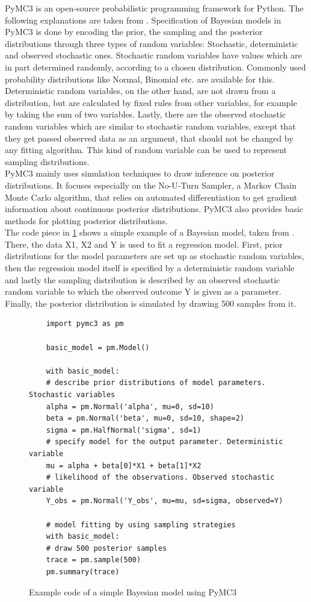 \documentclass{article}
\begin{document}
PyMC3 is an open-source probabilistic programming framework for Python. The following explanations are taken from \cite{Salvatier2016}. Specification of Bayesian models in PyMC3 is done by encoding the prior, the sampling and the posterior distributions through three types of random variables: Stochastic, deterministic and observed stochastic ones. Stochastic random variables have values which are in part determined randomly, according to a chosen distribution. Commonly used probability distributions like Normal, Binomial etc. are available for this. Deterministic random variables, on the other hand, are not drawn from a distribution, but are calculated by fixed rules from other variables, for example by taking the sum of two variables. Lastly, there are the observed stochastic random variables which are similar to stochastic random variables, except that they get passed observed data as an argument, that should not be changed by any fitting algorithm.  This kind of random variable can be used to represent sampling distributions.
\\
PyMC3 mainly uses simulation techniques to draw inference on posterior distributions. It focuses especially on the No-U-Turn Sampler, a Markov Chain Monte Carlo algorithm, that relies on automated differentiation to get gradient information about continuous posterior distributions. PyMC3 also provides basic methods for plotting posterior distributions.
\\
The code piece  in \ref{fig:pymc3_example_code} shows a simple example of a Bayesian model, taken from \cite{Salvatier2016}. There, the data X1, X2 and Y is used to fit a regression model. First, prior distributions for the model parameters are set up as stochastic random variables, then the regression model itself is specified by a deterministic random variable and lastly the sampling distribution is described by an observed stochastic random variable to which the observed outcome Y is given as a parameter. Finally, the posterior distribution is simulated by drawing 500 samples from it.
\begin{figure}
	\begin{lstlisting}
	import pymc3 as pm
	
	basic_model = pm.Model()
	
	with basic_model:
	# describe prior distributions of model parameters. Stochastic variables
	alpha = pm.Normal('alpha', mu=0, sd=10)
	beta = pm.Normal('beta', mu=0, sd=10, shape=2)
	sigma = pm.HalfNormal('sigma', sd=1)
	# specify model for the output parameter. Deterministic variable
	mu = alpha + beta[0]*X1 + beta[1]*X2
	# likelihood of the observations. Observed stochastic variable
	Y_obs = pm.Normal('Y_obs', mu=mu, sd=sigma, observed=Y)
	
	# model fitting by using sampling strategies   
	with basic_model:
	# draw 500 posterior samples
	trace = pm.sample(500)
	pm.summary(trace)
	\end{lstlisting}
	\caption[Example code of a simple Bayesian model using PyMC3]{Example code of a simple Bayesian model using PyMC3}
	\label{fig:pymc3_example_code}
\end{figure}
\end{document}
